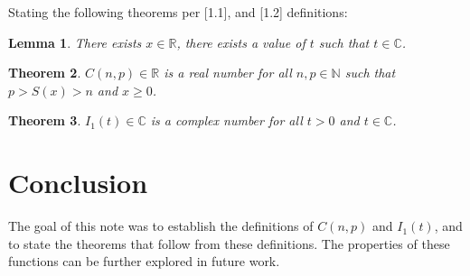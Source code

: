 \documentclass[11pt, a4paper]{article}
\theoremstyle{plain}
\newtheorem{theorem}{Theorem}[section]
\newtheorem{lemma}[theorem]{Lemma}
\theoremstyle{definition}
\theoremstyle{remark}
\begin{document}
Stating the following theorems per [1.1], and [1.2] definitions:

\begin{lemma}
There exists $x \in \mathbb{R}$, there exists a value of $t$ such that $t \in \mathbb{C}$.
\end{lemma}

\begin{theorem}
$C(n, p) \in \mathbb{R}$ is a real number for all $n, p \in \mathbb{N}$ such that $p > S(x) > n$ and $x \geq 0$.
\end{theorem}
\begin{theorem}
$I_{1}(t) \in \mathbb{C}$ is a complex number for all $t > 0$ and $t \in \mathbb{C}$.
\end{theorem}

\section{Conclusion}

The goal of this note was to establish the definitions of $C(n, p)$ and $I_{1}(t)$, and to state the theorems that follow from these definitions. The properties of these functions can be further explored in future work.

\nocite{*}


\end{document}
